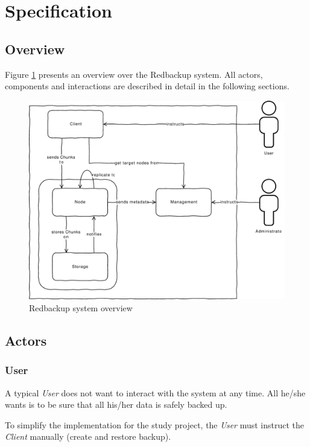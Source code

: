 
\section{Specification}\label{sec:specification}

\subsection{Overview}
Figure \ref{fig:architecture-overview} presents an overview over the Redbackup system. All actors, components and interactions are described in detail in the following sections.

\begin{figure}[h]
    \centering
    \includegraphics[width=1\linewidth]{resources/architecture_overview}
    \caption{Redbackup system overview}
    \label{fig:architecture-overview}
\end{figure}

\subsection{Actors}

\subsubsection{User}
A typical \emph{User} does not want to interact with the system at any time. All he/she wants is to be sure that all his/her data is safely backed up.

To simplify the implementation for the study project, the \emph{User} must instruct the \emph{Client} manually (create and restore backup).

